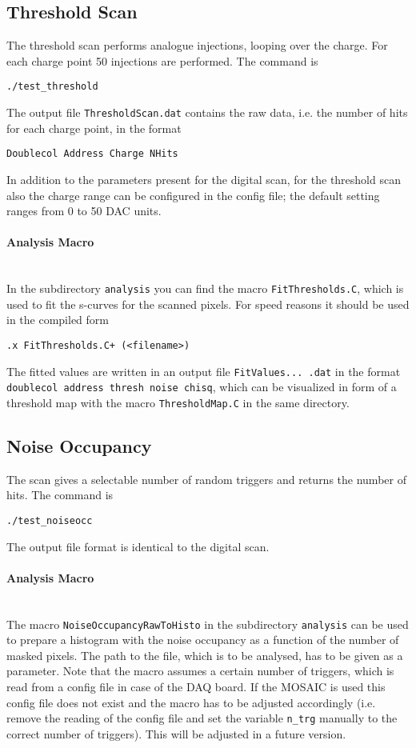 \documentclass{article}
\begin{document}
\subsection{Threshold Scan}
The threshold scan performs analogue injections, looping over the
charge. For each charge point 50 injections are performed. The command
is
\begin{verbatim}
./test_threshold
\end{verbatim}
The output file \texttt{ThresholdScan.dat} contains the raw data, i.e. the
number of hits for each charge point, in the format
\begin{verbatim}
Doublecol Address Charge NHits
\end{verbatim}
In addition to the parameters present for the digital scan, for the threshold scan also the charge range can be configured in the config file; the default setting ranges from 0 to 50 DAC units.

\paragraph {Analysis Macro} \hfill \\
In the subdirectory \texttt{analysis} you can find the macro \texttt{FitThresholds.C}, which is used to fit the s-curves for the scanned pixels. For speed reasons it should be used in the compiled form
\begin{verbatim}
.x FitThresholds.C+ (<filename>)
\end{verbatim}

The fitted values are written in an output file \texttt{FitValues... .dat} in the format \texttt{doublecol address thresh noise chisq}, which can be visualized in form of a threshold map with the macro \texttt{ThresholdMap.C} in the same directory.


\subsection{Noise Occupancy}
The scan gives a selectable number of random triggers and returns the
number of hits. The command is
\begin{verbatim}
./test_noiseocc
\end{verbatim}
The output file format is identical to the digital scan.

\paragraph {Analysis Macro} \hfill \\
The macro \texttt{NoiseOccupancyRawToHisto} in the subdirectory \texttt{analysis} can be used to prepare a histogram with the noise occupancy as a function of the number of masked pixels. The path to the file, which is to be analysed, has to be given as a parameter. Note that the macro assumes a certain number of triggers, which is read from a config file in case of the DAQ board. If the MOSAIC is used this config file does not exist and the macro has to be adjusted accordingly (i.e. remove the reading of the config file and set the variable \texttt{n\_trg} manually to the correct number of triggers). This will be adjusted in a future version.
\end{document}
